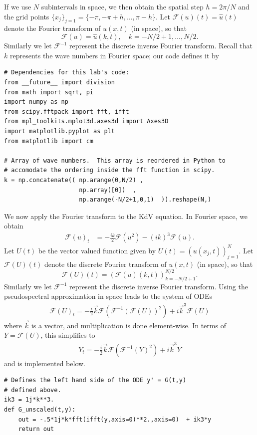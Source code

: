 If we use $N$ subintervals in space, we then obtain the spatial step $h = 2\pi/N$ and the grid points $\{x_j\}_{j=1} = \{-\pi,-\pi + h,\ldots,\pi-h\}$.  
Let $\mathcal{F}(u)(t) = \hat{u}(t)$ denote the Fourier transform of $u(x,t)$ (in space), so that 
\[
\mathcal{F}(u) = \hat{u}(k,t), \quad k=-N/2+1, \ldots, N/2.
\]
Similarly we let $\mathcal{F}^{-1}$ represent the discrete inverse Fourier transform.
Recall that $k$ represents the wave numbers in Fourier space; our code defines it by 
\begin{lstlisting}
# Dependencies for this lab's code:
from __future__ import division
from math import sqrt, pi
import numpy as np					
from scipy.fftpack import fft, ifft		
from mpl_toolkits.mplot3d.axes3d import Axes3D
import matplotlib.pyplot as plt
from matplotlib import cm

# Array of wave numbers.  This array is reordered in Python to 
# accomodate the ordering inside the fft function in scipy.
k = np.concatenate(( np.arange(0,N/2) ,
					 np.array([0])	,
					 np.arange(-N/2+1,0,1)	)).reshape(N,)
\end{lstlisting}


We now apply the Fourier transform to the KdV equation. In Fourier space, we obtain 
\begin{align*}
	\mathcal{F}(u)_t &= -\frac{ik}{2}\mathcal{F}(u^2)- (ik)^3\mathcal{F}(u).
\end{align*}
Let $U(t)$ be the vector valued function given by $U(t) = (u(x_j,t))_{j=1}^N$.
Let $\mathcal{F}(U)(t)$ denote the discrete Fourier transform of $u(x,t)$ (in space), so that 
\[
\mathcal{F}(U)(t) = (\mathcal{F}(u)(k,t))_{k=-N/2+1}^{N/2}.
\]
Similarly we let $\mathcal{F}^{-1}$ represent the discrete inverse Fourier transform.
Using the pseudospectral approximation in space leads to the system of ODEs
\begin{align}
	\mathcal{F}(U)_t =  -\frac{i}{2} \vec{k}\mathcal{F}\left( \mathcal{F}^{-1}(\mathcal{F}(U))^2\right) + i\vec{k}^3\mathcal{F}(U)
\end{align}
where $\vec{k}$ is a vector, and multiplication is done element-wise. In terms of $Y = \mathcal{F}(U)$, this simplifies to 
\begin{align}
	Y_t =  -\frac{i}{2} \vec{k}\mathcal{F}\left( \mathcal{F}^{-1}(Y)^2\right) + i\vec{k}^3Y
	\label{lab:solitons:pseudospectral}
\end{align}
and is implemented below.
\begin{lstlisting}
# Defines the left hand side of the ODE y' = G(t,y)
# defined above.
ik3 = 1j*k**3.
def G_unscaled(t,y):
	out = -.5*1j*k*fft(ifft(y,axis=0)**2.,axis=0)  + ik3*y        
	return out
\end{lstlisting}

